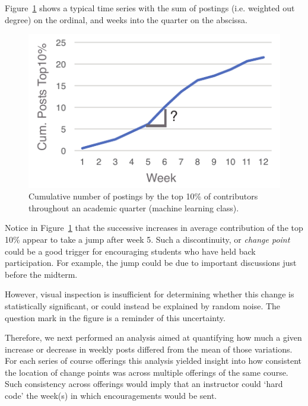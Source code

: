 Figure~\ref{fig:cs229OutDeg} shows a typical time series with the sum
of postings (i.e. weighted out degree) on the ordinal, and weeks into
the quarter on the abscissa.
\begin{figure}[]
       \centering
       \includegraphics{Figs/CS229Fall15DataContributionsNoFrills.pdf}
       \caption{\textnormal{Cumulative number of postings by the top 10\% of
           contributors throughout an academic quarter (machine
           learning class).}}
       \label{fig:cs229OutDeg}
\end{figure}
Notice in Figure~\ref{fig:cs229OutDeg} that the successive increases
in average contribution of the top 10\% appear to take a jump after
week 5. Such a discontinuity, or {\em change point} could be a good
trigger for encouraging students who have held back participation. For
example, the jump could be due to important discussions just before
the midterm.

However, visual inspection is insufficient for determining whether
this change is statistically significant, or could instead be
explained by random noise. The question mark in the figure is a
reminder of this uncertainty.

Therefore, we next performed an analysis aimed at quantifying how much
a given increase or decrease in weekly posts differed from the mean of
those variations. For each series of course offerings this analysis
yielded insight into how consistent the location of change points was
across multiple offerings of the same course. Such consistency across
offerings would imply that an instructor could `hard code' the week(s)
in which encouragements would be sent.

